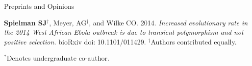 \documentclass{resume} %
\begin{document}


\vspace*{0.5cm}
\begin{rSection}{Preprints and Opinions}	
\vspace*{0.25cm}
	
\begin{etaremune}[leftmargin=1.5em]
	
\item \textbf{Spielman SJ}$^\dagger$, Meyer, AG$^\dagger$, and Wilke CO. 2014. \emph{Increased evolutionary rate in the 2014 West African Ebola outbreak is due to transient polymorphism and not positive selection.} bioRxiv doi: 10.1101/011429. $^\dagger$Authors contributed equally. \\
			
\end{etaremune}
	
$^\ast$Denotes undergraduate co-author.
	
	
\end{rSection}



\end{document}
